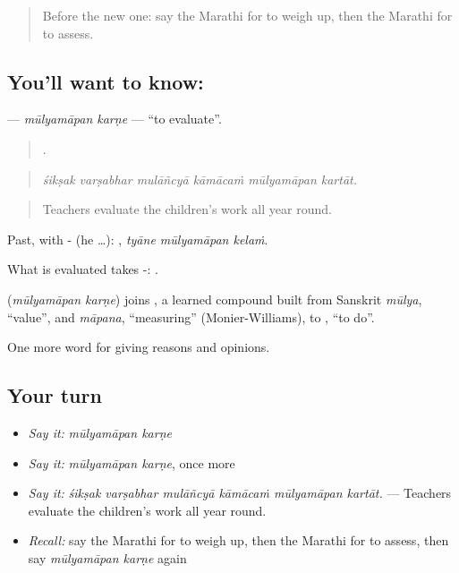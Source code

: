 \label{lesson:MR-C376-mulyamapan-karne}



\begin{quote}
Before the new one: say the Marathi for to weigh up, then the Marathi for to assess.
\end{quote}

\subsection*{You'll want to know:  }
\textbf{ } — \emph{mūlyamāpan karṇe} — \textquotedblleft{}to evaluate\textquotedblright{}.

\begin{quote}
     .
\end{quote}

\begin{quote}
\emph{śikṣak varṣabhar mulāñcyā kāmācaṁ mūlyamāpan kartāt.}
\end{quote}

\begin{quote}
Teachers evaluate the children's work all year round.
\end{quote}

Past, with - (he …):   , \emph{tyāne mūlyamāpan kelaṁ}.

What is evaluated takes -:  .

\begin{cousinweb}
\textbf{ } (\emph{mūlyamāpan karṇe}) joins , a learned compound built from Sanskrit \emph{mūlya}, \textquotedblleft{}value\textquotedblright{}, and \emph{māpana}, \textquotedblleft{}measuring\textquotedblright{} (Monier-Williams), to , \textquotedblleft{}to do\textquotedblright{}.
\end{cousinweb}

\begin{grammarlens}[title={What you've built}]
One more word for giving reasons and opinions.
\end{grammarlens}

\subsection*{Your turn}
\begin{itemize}
\raggedright
  \item \emph{Say it:} \emph{mūlyamāpan karṇe}
  \item \emph{Say it:} \emph{mūlyamāpan karṇe}, once more
  \item \emph{Say it:} \emph{śikṣak varṣabhar mulāñcyā kāmācaṁ mūlyamāpan kartāt.} — Teachers evaluate the children's work all year round.
  \item \emph{Recall:} say the Marathi for to weigh up, then the Marathi for to assess, then say \emph{mūlyamāpan karṇe} again
\end{itemize}

